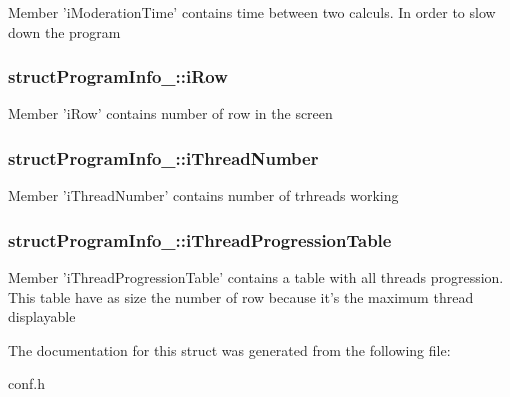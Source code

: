 Member 'i\-Moderation\-Time' contains time between two calculs. In order to slow down the program \hypertarget{structstructProgramInfo___ad25be399a938e3c823f212599c944b38}{
\subsubsection[{i\-Row}]{\setlength{\rightskip}{0pt plus 5cm}struct\-Program\-Info\-\_\-\-::i\-Row}}\label{structstructProgramInfo___ad25be399a938e3c823f212599c944b38}
Member 'i\-Row' contains number of row in the screen \hypertarget{structstructProgramInfo___aa18bd69e1938ec0d95062bb5090900a0}{
\subsubsection[{i\-Thread\-Number}]{\setlength{\rightskip}{0pt plus 5cm}struct\-Program\-Info\-\_\-\-::i\-Thread\-Number}}\label{structstructProgramInfo___aa18bd69e1938ec0d95062bb5090900a0}
Member 'i\-Thread\-Number' contains number of trhreads working \hypertarget{structstructProgramInfo___a29b88009103b7ea74f32a509fab1ac20}{
\subsubsection[{i\-Thread\-Progression\-Table}]{\setlength{\rightskip}{0pt plus 5cm}struct\-Program\-Info\-\_\-\-::i\-Thread\-Progression\-Table}}\label{structstructProgramInfo___a29b88009103b7ea74f32a509fab1ac20}
Member 'i\-Thread\-Progression\-Table' contains a table with all threads progression. This table have as size the number of row because it's the maximum thread displayable 

The documentation for this struct was generated from the following file\-:\begin{DoxyCompactItemize}
\item 
conf.\-h\end{DoxyCompactItemize}
